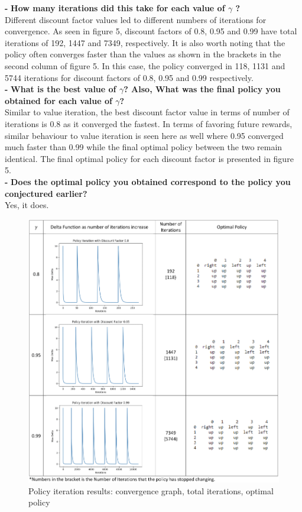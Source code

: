\documentclass[11pt]{article}
\begin{document}
\noindent
\textbf{-}
\noindent
\textbf{How many iterations did this take for each value of $\gamma$ ?}
\\

\noindent
Different discount factor values led to different numbers of iterations for
convergence. As seen in figure 5, discount factors of 0.8, 0.95 and 0.99 have
total iterations of 192, 1447 and 7349, respectively. It is also worth noting
that the policy often converges faster than the values as shown in the brackets
in the second column of figure 5. In this case, the policy converged in 118,
1131 and 5744 iterations for discount factors of 0.8, 0.95 and 0.99
respectively. \\

\noindent
\textbf{-}
\noindent
\textbf{What is the best value of $\gamma$? Also, What was the final policy you
obtained for each value of $\gamma$?}
\\

\noindent
Similar to value iteration, the best discount factor value in terms of number of
iterations is 0.8 as it converged the fastest. In terms of favoring future
rewards, similar behaviour to value iteration is seen here as well where 0.95
converged much faster than 0.99 while the final optimal policy between the two
remain identical. The final optimal policy for each discount factor is presented
in figure 5. \\

\noindent
\textbf{-}
\noindent
\textbf{Does the optimal policy you obtained correspond to the policy you
conjectured earlier?}
\\

\noindent
Yes, it does.
\\

\newpage
\begin{figure}[h]
\includegraphics[scale=0.5]{PI_chart}
\centering
\caption{Policy iteration results: convergence graph, total iterations, optimal policy}
\end{figure}
\end{document}
